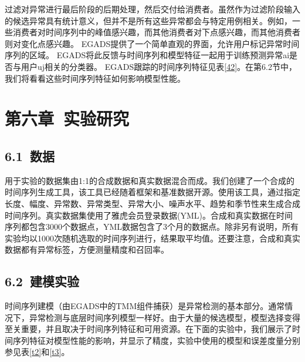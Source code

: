 \documentclass[a4paper,AutoFakeBold,oneside,12pt]{book}
\begin{document}
过滤对异常进行最后阶段的后期处理，然后交付给消费者。虽然作为过滤阶段输入的候选异常具有统计意义，但并不是所有这些异常都会与特定用例相关。例如，一些消费者对时间序列中的峰值感兴趣，而其他消费者对下点感兴趣，而其他消费者则对变化点感兴趣。 EGADS提供了一个简单直观的界面，允许用户标记异常时间序列的区域。 EGADS将此反馈与时间序列和模型特征一起用于训练预测异常ai是否与用户uj相关的分类器。 EGADS跟踪的时间序列特征见表\ref{42}。在第6.2节中，我们将看看这些时间序列特征如何影响模型性能。


\chapter*{第六章\ 实验研究}

\section*{6.1\ 数据}
用于实验的数据集由1:1的合成数据和真实数据混合而成。我们创建了一个合成的时间序列生成工具，该工具已经随着框架和基准数据开源。使用该工具，通过指定长度、幅度、异常数、异常类型、异常大小、噪声水平、趋势和季节性来生成合成时间序列。真实数据集使用了雅虎会员登录数据(YML)。合成和真实数据在时间序列都包含3000个数据点，YML数据包含了3个月的数据点。除非另有说明，所有实验均以1000次随机选取的时间序列进行，结果取平均值。还要注意，合成和真实数据都有异常标签，方便测量精度和召回率。

\section*{6.2\ 建模实验}
时间序列建模（由EGADS中的TMM组件捕获）是异常检测的基本部分。通常情况下，异常检测与底层时间序列模型一样好。由于大量的候选模型，模型选择变得至关重要，并且取决于时间序列特征和可用资源。在下面的实验中，我们展示了时间序列特征对模型性能的影响，并显示了精度，实验中使用的模型和误差度量分别参见表\ref{t2}和\ref{t3}。
\end{document}
